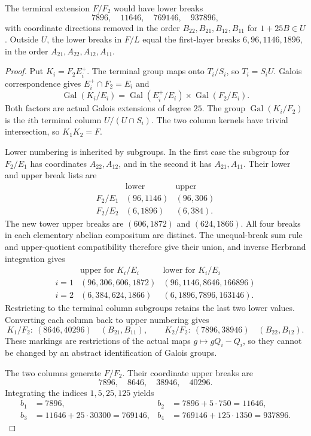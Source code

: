 \begin{proposition}\label{prop:exact-terminal-filtration}
The terminal extension $F/F_2$ would have lower breaks
\[
                  7896,\quad11646,\quad769146,\quad937896,
\]
with coordinate directions removed in the order $B_{22},B_{21},B_{12},B_{11}$ for $1+25B\in U$. Outside $U$, the lower breaks in $F/L$ equal the first-layer breaks $6,96,1146,1896$, in the order $A_{21},A_{22},A_{12},A_{11}$.
\end{proposition}
\begin{proof}
Put $K_i=F_2E_i^+$. The terminal group maps onto $T_i/S_i$, so $T_i=S_iU$. Galois correspondence gives $E_i^+\cap F_2=E_i$ and
\[
 \operatorname{Gal}(K_i/E_i)
 =\operatorname{Gal}(E_i^+/E_i)\times\operatorname{Gal}(F_2/E_i).
\]
Both factors are actual Galois extensions of degree $25$. The group $\operatorname{Gal}(K_i/F_2)$ is the $i$th terminal column $U/(U\cap S_i)$. The two column kernels have trivial intersection, so $K_1K_2=F$.

Lower numbering is inherited by subgroups. In the first case the subgroup for $F_2/E_1$ has coordinates $A_{22},A_{12}$, and in the second it has $A_{21},A_{11}$. Their lower and upper break lists are
\[
\begin{array}{c|c|c}
 &\text{lower}&\text{upper}\\\hline
 F_2/E_1&(96,1146)&(96,306)\\
 F_2/E_2&(6,1896)&(6,384).
\end{array}
\]
The new tower upper breaks are $(606,1872)$ and $(624,1866)$. All four breaks in each elementary abelian compositum are distinct. The unequal-break sum rule and upper-quotient compatibility therefore give their union, and inverse Herbrand integration gives
\[
\begin{array}{c|c|c}
 &\text{upper for }K_i/E_i&\text{lower for }K_i/E_i\\\hline
 i=1&(96,306,606,1872)&(96,1146,8646,166896)\\
 i=2&(6,384,624,1866)&(6,1896,7896,163146).
\end{array}
\]
Restricting to the terminal column subgroups retains the last two lower values. Converting each column back to upper numbering gives
\[
 K_1/F_2:\ (8646,40296)\quad(B_{21},B_{11}),\qquad
 K_2/F_2:\ (7896,38946)\quad(B_{22},B_{12}).
\]
These markings are restrictions of the actual maps $g\mapsto gQ_i-Q_i$, so they cannot be changed by an abstract identification of Galois groups.

The two columns generate $F/F_2$. Their coordinate upper breaks are
\[
               7896,\quad8646,\quad38946,\quad40296.
\]
Integrating the indices $1,5,25,125$ yields
\[
\begin{aligned}
 b_1&=7896,& b_2&=7896+5\cdot750=11646,\\
 b_3&=11646+25\cdot30300=769146,&
 b_4&=769146+125\cdot1350=937896.
\end{aligned}
\]


\end{proof}
